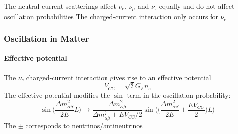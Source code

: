 \documentclass[10pt,professionalfonts,xcolor=table]{beamer}
\begin{document}
{\begin{itemize}
\begin{columns}[c]
\end{columns}
\bang The neutral-current scatterings affect $\nu_e$, $\nu_\mu$ and $\nu_\tau$ equally and do not affect oscillation probabilities
\bang The charged-current interaction only occurs for $\nu_e$

\end{itemize}
}
\frame
{
  \frametitle{Oscillation in Matter}
\begin{itemize}
  \framesubtitle{Effective potential}
\bang The $\nu_e$ charged-current interaction gives rise to an effective potential:
\begin{equation*}
V_{CC} = \sqrt{2}G_F n_e
\end{equation*}
\bang The effective potential modifies the $\sin$ term in the oscillation probability:
\begin{equation*}
\sin\bigg(\frac{\Delta m_{\alpha\beta}^2}{2E}L\bigg) \rightarrow
\frac{\Delta m_{\alpha\beta}^2}{\Delta m_{\alpha\beta}^2 \pm E V_{CC}/2} \sin\bigg(\big(\frac{\Delta m_{\alpha\beta}^2}{2E} \pm \frac{EV_{CC}}{2}\big)L \bigg)
\end{equation*}
\bang The $\pm$ corresponds to neutrinos/antineutrinos
  \end{itemize}
}
\end{document}
